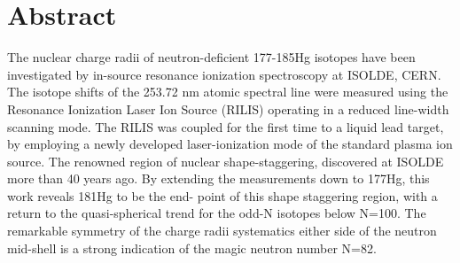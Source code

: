 \section{Abstract}
The nuclear charge radii of neutron-deficient 177-185Hg isotopes have been investigated by in-source resonance ionization spectroscopy at ISOLDE, CERN.  The isotope shifts of the 253.72 nm atomic spectral line were measured using the Resonance Ionization Laser Ion Source (RILIS) operating in a reduced line-width scanning mode.  The RILIS was coupled for the first time to a liquid lead target, by employing a newly developed laser-ionization mode of the standard plasma ion source. The renowned region of nuclear shape-staggering, discovered at ISOLDE more than 40 years ago.  By extending the measurements down to 177Hg, this work reveals 181Hg to be the end- point of this shape staggering region, with a return to the quasi-spherical trend for the odd-N isotopes below N=100.  The remarkable symmetry of the charge radii systematics either side of the neutron mid-shell is a strong indication of the magic neutron number N=82.